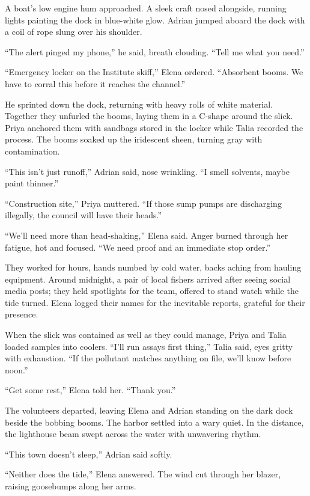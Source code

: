 A boat’s low engine hum approached. A sleek craft nosed alongside, running lights painting the dock in blue-white glow. Adrian jumped aboard the dock with a coil of rope slung over his shoulder.

“The alert pinged my phone,” he said, breath clouding. “Tell me what you need.”

“Emergency locker on the Institute skiff,” Elena ordered. “Absorbent booms. We have to corral this before it reaches the channel.”

He sprinted down the dock, returning with heavy rolls of white material. Together they unfurled the booms, laying them in a C-shape around the slick. Priya anchored them with sandbags stored in the locker while Talia recorded the process. The booms soaked up the iridescent sheen, turning gray with contamination.

“This isn’t just runoff,” Adrian said, nose wrinkling. “I smell solvents, maybe paint thinner.”

“Construction site,” Priya muttered. “If those sump pumps are discharging illegally, the council will have their heads.”

“We’ll need more than head-shaking,” Elena said. Anger burned through her fatigue, hot and focused. “We need proof and an immediate stop order.”

They worked for hours, hands numbed by cold water, backs aching from hauling equipment. Around midnight, a pair of local fishers arrived after seeing social media posts; they held spotlights for the team, offered to stand watch while the tide turned. Elena logged their names for the inevitable reports, grateful for their presence.

When the slick was contained as well as they could manage, Priya and Talia loaded samples into coolers. “I’ll run assays first thing,” Talia said, eyes gritty with exhaustion. “If the pollutant matches anything on file, we’ll know before noon.”

“Get some rest,” Elena told her. “Thank you.”

The volunteers departed, leaving Elena and Adrian standing on the dark dock beside the bobbing booms. The harbor settled into a wary quiet. In the distance, the lighthouse beam swept across the water with unwavering rhythm.

“This town doesn’t sleep,” Adrian said softly.

“Neither does the tide,” Elena answered. The wind cut through her blazer, raising goosebumps along her arms.

